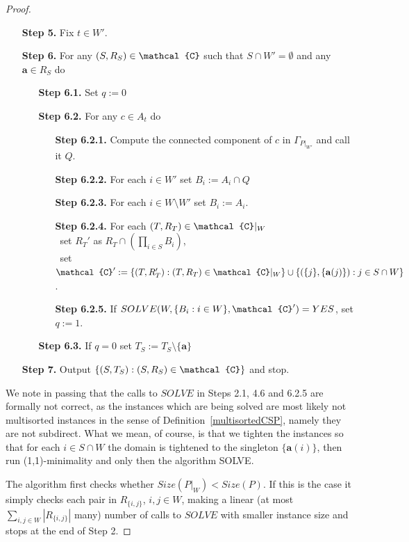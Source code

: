 \documentclass[11pt]{amsart}
\newcommand{\vr}[1]{{\uppercase {\mathcal{#1}}}}
\theoremstyle{definition}
\begin{document}
\begin{proof}
\begin{enumerate}
\begin{enumerate}
\end{enumerate}
\item[{\bf Step 5.}] Fix $t\in W'$.
\item[{\bf Step 6.}] For any $(S,R_S)\in\vr c$ such that $S\cap W'=\emptyset$ and any $\mathbf{a}\in R_S$ do
\begin{enumerate}
\item[{\bf Step 6.1.}] Set $q:=0$
\item[{\bf Step 6.2.}] For any $c\in A_t$ do
\begin{enumerate}
\item[{\bf Step 6.2.1.}] Compute the connected component of $c$ in $\Gamma_{P|_{W'}}$ and call it $Q$.
\item[{\bf Step 6.2.2.}] For each $i\in W'$ set $B_i:=A_i\cap Q$ 
\item[{\bf Step 6.2.3.}] For each $i\in W\setminus W'$ set $B_i:=A_i$.
\item[{\bf Step 6.2.4.}] For each $(T,R_T)\in\vr c|_W$ \\
\mbox{ }\hspace{-1.2cm}set $R_T'$ as $R_T\cap(\prod_{i\in S}B_i)$,\\ 
\mbox{ }\hspace{-1.2cm}set $\vr c':=\{(T,R_T'):(T,R_T)\in\vr c|_W\}\cup\{(\{j\},\{\mathbf{a}(j)\}):j\in S\cap W\}$.
\item[{\bf Step 6.2.5.}] If $SOLVE(W,\{B_i:i\in W\},\vr c')=YES$, set $q:=1$.
\end{enumerate}
\item[{\bf Step 6.3.}] If $q=0$ set $T_S:=T_S\setminus\{\mathbf{a}\}$
\end{enumerate}
\item[{\bf Step 7.}] Output $\{(S,T_S):(S,R_S)\in \vr c\}$ and stop.
\end{enumerate}

We note in passing that the calls to $SOLVE$ in Steps 2.1, 4.6 and 6.2.5 are formally not correct, as the instances which are being solved are most likely not multisorted instances in the sense of Definition~\ref{multisortedCSP}, namely they are not subdirect. What we mean, of course, is that we tighten the instances so that for each $i\in S\cap W$ the domain is tightened to the singleton $\{\mathbf{a}(i)\}$, then run (1,1)-minimality and only then the algorithm SOLVE.

The algorithm first checks whether $Size(P|_W)<Size(P)$. If this is the case it simply checks each pair in $R_{\{i,j\}}$, $i,j\in W$, making a linear (at most $\sum\limits_{i,j\in W}|R_{\{i,j\}}|$ many) number of calls to $SOLVE$ with smaller instance size and stops at the end of Step 2. 


\end{proof}
\end{document}
